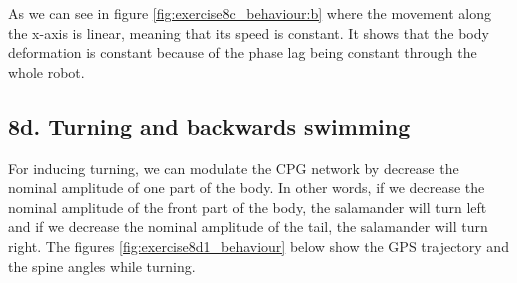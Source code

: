 \documentclass{cmc}
\begin{document}
 As we can see in figure \ref{fig:exercise8c_behaviour:b} where the movement along the x-axis is linear, meaning that its speed is constant. It shows that the body deformation is constant because of the phase lag being constant through the whole robot.

\subsection*{8d. Turning and backwards swimming}
\label{sec:turning-backwards}
For inducing turning, we can modulate the CPG network by decrease the nominal amplitude of one part of the body. In other words, if we decrease the nominal amplitude of the front part of the body, the salamander will turn left and if we decrease the nominal amplitude of the tail, the salamander will turn right.
The figures \ref{fig:exercise8d1_behaviour} below show the GPS trajectory and the spine angles while turning.
\end{document}
